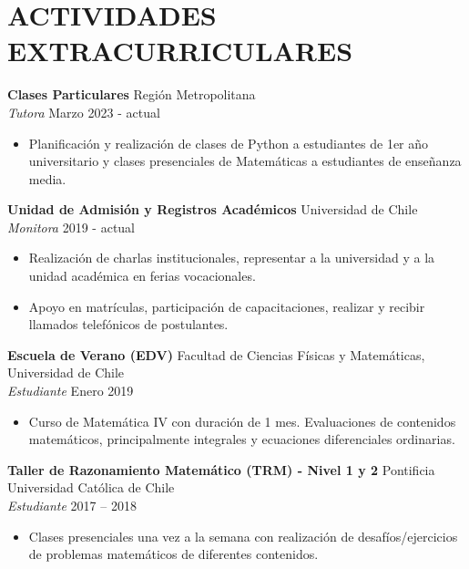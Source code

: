 \documentclass[a4paper, 10pt]{extarticle}
\begin{document}
\section*{ACTIVIDADES EXTRACURRICULARES}
\noindent
\textbf{Clases Particulares} \hfill Región Metropolitana\\
\textit{Tutora} \hfill Marzo 2023 - actual 
\begin{itemize}
    \item Planificación y realización de clases de Python a estudiantes de 1er año universitario y clases presenciales de Matemáticas a estudiantes de enseñanza media.
\end{itemize}

\noindent
\textbf{Unidad de Admisión y Registros Académicos} \hfill Universidad de Chile\\
\textit{Monitora} \hfill 2019 - actual 
\begin{itemize}
    \item Realización de charlas institucionales, representar a la universidad y a la unidad académica en ferias vocacionales.
    \item Apoyo en matrículas, participación de capacitaciones, realizar y recibir llamados telefónicos de postulantes.
\end{itemize}

\noindent
\textbf{Escuela de Verano (EDV)} \hfill Facultad de Ciencias Físicas y Matemáticas, Universidad de Chile\\ 
\textit{Estudiante} \hfill Enero 2019 
\begin{itemize}
    \item Curso de Matemática IV con duración de 1 mes. Evaluaciones de contenidos matemáticos, principalmente integrales y ecuaciones diferenciales ordinarias.
\end{itemize}

\textbf{Taller de Razonamiento Matemático (TRM) - Nivel 1 y 2} \hfill Pontificia Universidad Católica de Chile\\
\textit{Estudiante} \hfill 2017 – 2018 
\begin{itemize}
    \item Clases presenciales una vez a la semana con realización de desafíos/ejercicios de problemas matemáticos de diferentes contenidos. 
\end{itemize}

\end{document}
